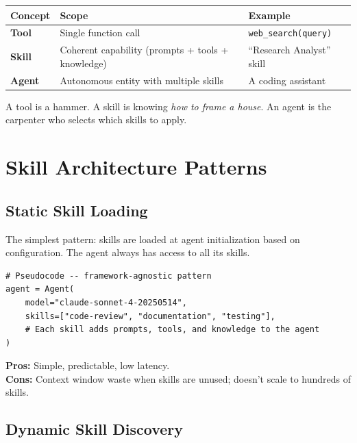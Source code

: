 \begin{keybox}
\begin{tabular}{@{}lp{5cm}p{8cm}@{}}
\toprule
\textbf{Concept} & \textbf{Scope} & \textbf{Example} \\
\midrule
\textbf{Tool} & Single function call & \texttt{web\_search(query)} \\
\textbf{Skill} & Coherent capability (prompts + tools + knowledge) & ``Research Analyst'' skill \\
\textbf{Agent} & Autonomous entity with multiple skills & A coding assistant \\
\bottomrule
\end{tabular}

A tool is a hammer. A skill is knowing \emph{how to frame a house}. An agent is the carpenter who selects which skills to apply.
\end{keybox}

\section{Skill Architecture Patterns}
\label{skill-architecture-patterns}

\subsection{Static Skill Loading}
\label{static-skill-loading}

The simplest pattern: skills are loaded at agent initialization based on configuration. The agent always has access to all its skills.

\begin{lstlisting}[style=pythonstyle]
# Pseudocode -- framework-agnostic pattern
agent = Agent(
    model="claude-sonnet-4-20250514",
    skills=["code-review", "documentation", "testing"],
    # Each skill adds prompts, tools, and knowledge to the agent
)
\end{lstlisting}

\textbf{Pros:} Simple, predictable, low latency.\\

\textbf{Cons:} Context window waste when skills are unused; doesn’t scale to hundreds of skills.

\subsection{Dynamic Skill Discovery}
\label{dynamic-skill-discovery}


